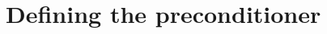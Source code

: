 \documentclass[12pt]{article}
\begin{document}



\section{Defining the preconditioner}
\end{document}
